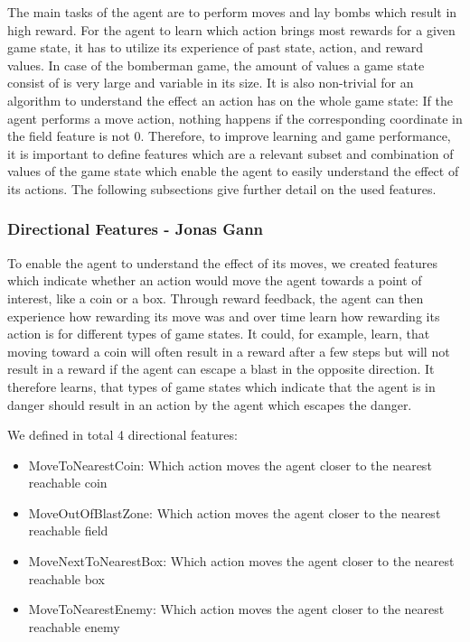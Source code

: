 \documentclass{article}
\begin{document}
The main tasks of the agent are to perform moves and lay bombs which result in high reward. For the agent to learn which action brings most rewards for a given game state, it has to utilize its experience of past state, action, and reward values. In case of the bomberman game, the amount of values a game state consist of is very large and variable in its size. It is also non-trivial for an algorithm to understand the effect an action has on the whole game state: If the agent performs a move action, nothing happens if the corresponding coordinate in the field feature is not 0. Therefore, to improve learning and game performance, it is important to define features which are a relevant subset and combination of values of the game state which enable the agent to easily understand the effect of its actions. The following subsections give further detail on the used features. 

\subsubsection[Directional Features]{Directional Features {\small - Jonas Gann}}
\label{section:directional_features}

To enable the agent to understand the effect of its moves, we created features which indicate whether an action would move the agent towards a point of interest, like a coin or a box. Through reward feedback, the agent can then experience how rewarding its move was and over time learn how rewarding its action is for different types of game states. It could, for example, learn, that moving toward a coin will often result in a reward after a few steps but will not result in a reward if the agent can escape a blast in the opposite direction. It therefore learns, that types of game states which indicate that the agent is in danger should result in an action by the agent which escapes the danger.

We defined in total 4 directional features:

\begin{itemize}
    \item MoveToNearestCoin: Which action moves the agent closer to the nearest reachable coin
    \item MoveOutOfBlastZone: Which action moves the agent closer to the nearest reachable field
    \item MoveNextToNearestBox: Which action moves the agent closer to the nearest reachable box
    \item MoveToNearestEnemy: Which action moves the agent closer to the nearest reachable enemy
\end{itemize}
\end{document}
